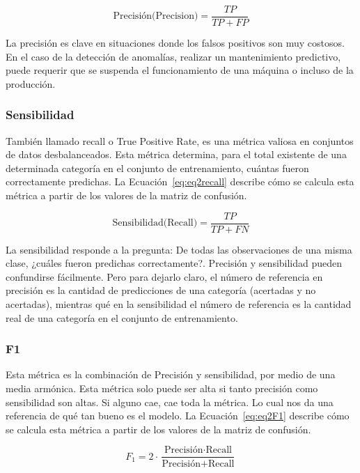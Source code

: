 \documentclass[11pt,a4paper,spanish]{book}
\numberwithin{equation}{chapter}
\numberwithin{figure}{chapter}
\begin{document}
\begin{equation}\label{eq:eq2precision}
\text{Precisión(Precision)} = \frac{TP}{TP + FP}
\end{equation}

La precisión es clave en situaciones donde los falsos positivos son muy costosos. En el caso de la detección de anomalías, realizar un mantenimiento predictivo, puede requerir que se suspenda el funcionamiento de una máquina o incluso de la producción. 


\subsubsection{Sensibilidad}

También llamado recall o True Positive Rate, es una métrica valiosa en conjuntos de datos desbalanceados. Esta métrica determina, para el total existente de una determinada categoría en el conjunto de entrenamiento, cuántas fueron correctamente predichas. La Ecuación~\eqref{eq:eq2recall} describe cómo se calcula esta métrica a partir de los valores de la matriz de confusión. 

\begin{equation}\label{eq:eq2recall}
\text{Sensibilidad(Recall)} = \frac{TP}{TP + FN}
\end{equation}

La sensibilidad responde a la pregunta: De todas las observaciones de una misma clase, ¿cuáles fueron predichas correctamente?. Precisión y sensibilidad pueden confundirse fácilmente. Pero para dejarlo claro, el número de referencia en precisión es la cantidad de predicciones de una categoría (acertadas y no acertadas), mientras qué en la sensibilidad el número de referencia es la cantidad real de una categoría en el conjunto de entrenamiento.


\subsubsection{F1}

Esta métrica es la combinación de Precisión y sensibilidad, por medio de una media armónica. Esta métrica solo puede ser alta si tanto precisión como sensibilidad son altas. Si alguno cae, cae toda la métrica. Lo cual nos da una referencia de qué tan bueno es el modelo. La Ecuación~\eqref{eq:eq2F1} describe cómo se calcula esta métrica a partir de los valores de la matriz de confusión. 

\begin{equation}\label{eq:eq2F1}
F_1 = 2 \cdot \frac{\text{Precisión} \cdot \text{Recall}}{\text{Precisión} + \text{Recall}}
\end{equation}
\end{document}
